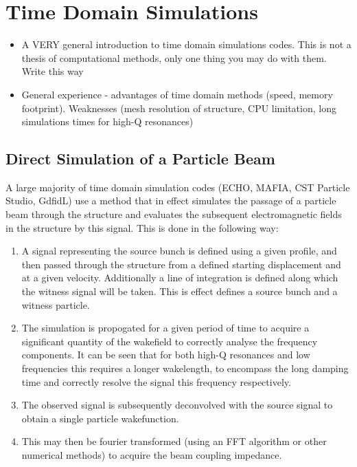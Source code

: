 \section{Time Domain Simulations}



\begin{itemize}
\item{A VERY general introduction to time domain simulations codes. This is not a thesis of computational methods, only one thing you may do with them. Write this way}
\item{General experience - advantages of time domain methods (speed, memory footprint). Weaknesses (mesh resolution of structure, CPU limitation, long simulations times for high-Q resonances)}
\end{itemize}

\subsection{Direct Simulation of a Particle Beam}

A large majority of time domain simulation codes (ECHO, MAFIA, CST Particle Studio, GdfidL) use a method that in effect simulates the passage of a particle beam through the structure and evaluates the subsequent electromagnetic fields in the structure by this signal. This is done in the following way:

\begin{enumerate}
\item{A signal representing the source bunch is defined using a given profile, and then passed through the structure from a defined starting displacement and at a given velocity. Additionally a line of integration is defined along which the witness signal will be taken. This is effect defines a source bunch and a witness particle.}
\item{The simulation is propogated for a given period of time to acquire a significant quantity of the wakefield to correctly analyse the frequency components. It can be seen that for both high-Q resonances and low frequencies this requires a longer wakelength, to encompass the long damping time and correctly resolve the signal this frequency respectively.}
\item{The observed signal is subsequently deconvolved with the source signal to obtain a single particle wakefunction.}
\item{This may then be fourier transformed (using an FFT algorithm or other numerical methods) to acquire the beam coupling impedance.}
\end{enumerate}

